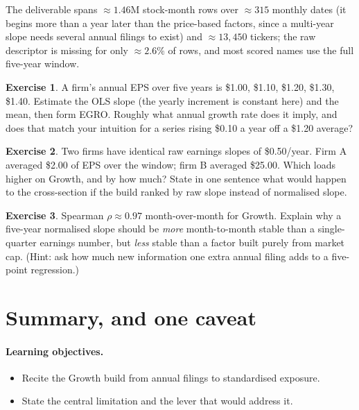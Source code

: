 \documentclass[11pt]{article}
\theoremstyle{definition}
\newtheorem{exercise}{Exercise}[section]
\theoremstyle{plain}
\theoremstyle{remark}
\begin{document}
\begin{observed}
The deliverable spans $\approx 1.46$M stock-month rows over $\approx 315$ monthly dates (it begins more than a year later than the price-based factors, since a multi-year slope needs several annual filings to exist) and $\approx 13{,}450$ tickers; the raw descriptor is missing for only $\approx 2.6\%$ of rows, and most scored names use the full five-year window.
\end{observed}

\begin{exercise}
A firm's annual EPS over five years is \$1.00, \$1.10, \$1.20, \$1.30, \$1.40. Estimate the OLS slope (the yearly increment is constant here) and the mean, then form EGRO. Roughly what annual growth rate does it imply, and does that match your intuition for a series rising \$0.10 a year off a \$1.20 average?
\end{exercise}

\begin{exercise}
Two firms have identical raw earnings slopes of \$0.50/year. Firm A averaged \$2.00 of EPS over the window; firm B averaged \$25.00. Which loads higher on Growth, and by how much? State in one sentence what would happen to the cross-section if the build ranked by raw slope instead of normalised slope.
\end{exercise}

\begin{exercise}
Spearman $\rho \approx 0.97$ month-over-month for Growth. Explain why a five-year normalised slope should be \emph{more} month-to-month stable than a single-quarter earnings number, but \emph{less} stable than a factor built purely from market cap. (Hint: ask how much new information one extra annual filing adds to a five-point regression.)
\end{exercise}

\section{Summary, and one caveat}\label{sec:summary}

\paragraph{Learning objectives.}
\begin{itemize}[leftmargin=1.4em,topsep=2pt]
  \item Recite the Growth build from annual filings to standardised exposure.
  \item State the central limitation and the lever that would address it.
\end{itemize}
\end{document}

